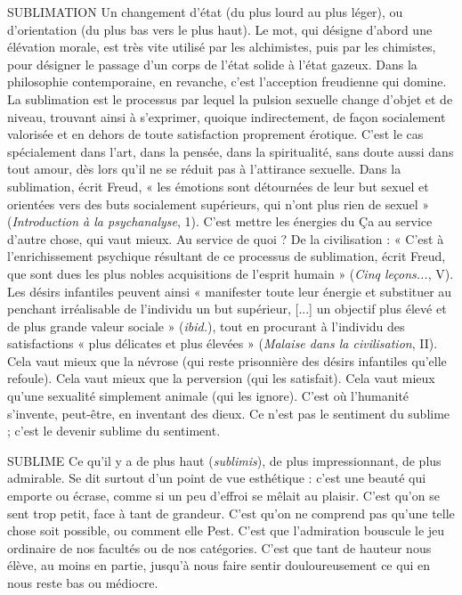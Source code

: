 SUBLIMATION Un changement d’état (du plus lourd au plus léger), ou
d'orientation (du plus bas vers le plus haut). Le mot, qui
désigne d’abord une élévation morale, est très vite utilisé par les alchimistes,
puis par les chimistes, pour désigner le passage d’un corps de l’état solide à
l’état gazeux. Dans la philosophie contemporaine, en revanche, c’est l’acception
freudienne qui domine. La sublimation est le processus par lequel la pulsion
sexuelle change d’objet et de niveau, trouvant ainsi à s'exprimer,
quoique indirectement, de façon socialement valorisée et en dehors de toute
satisfaction proprement érotique. C’est le cas spécialement dans l’art, dans la
pensée, dans la spiritualité, sans doute aussi dans tout amour, dès lors qu’il
ne se réduit pas à l’attirance sexuelle. Dans la sublimation, écrit Freud, « les
émotions sont détournées de leur but sexuel et orientées vers des buts socialement
supérieurs, qui n’ont plus rien de sexuel » ({\it Introduction à la psychanalyse},
1). C’est mettre les énergies du Ça au service d’autre chose, qui vaut
mieux. Au service de quoi ? De la civilisation : « C’est à l'enrichissement psychique
résultant de ce processus de sublimation, écrit Freud, que sont dues
les plus nobles acquisitions de l’esprit humain » ({\it Cinq leçons...}, V). Les désirs
infantiles peuvent ainsi « manifester toute leur énergie et substituer au penchant
irréalisable de l'individu un but supérieur, [...] un objectif plus élevé
et de plus grande valeur sociale » ({\it ibid.}), tout en procurant à l'individu des
satisfactions « plus délicates et plus élevées » ({\it Malaise dans la civilisation}, II).
Cela vaut mieux que la névrose (qui reste prisonnière des désirs infantiles
qu’elle refoule). Cela vaut mieux que la perversion (qui les satisfait). Cela
vaut mieux qu’une sexualité simplement animale (qui les ignore). C’est où
l'humanité s’invente, peut-être, en inventant des dieux. Ce n’est pas le sentiment
du sublime ; c’est le devenir sublime du sentiment.

SUBLIME Ce qu'il y a de plus haut ({\it sublimis}), de plus impressionnant, de
plus admirable. Se dit surtout d’un point de vue esthétique : c’est
une beauté qui emporte ou écrase, comme si un peu d’effroi se mêlait au plaisir.
C’est qu’on se sent trop petit, face à tant de grandeur. C’est qu'on ne comprend
pas qu’une telle chose soit possible, ou comment elle Pest. C’est que
l'admiration bouscule le jeu ordinaire de nos facultés ou de nos catégories.
C’est que tant de hauteur nous élève, au moins en partie, jusqu’à nous faire
sentir douloureusement ce qui en nous reste bas ou médiocre.

